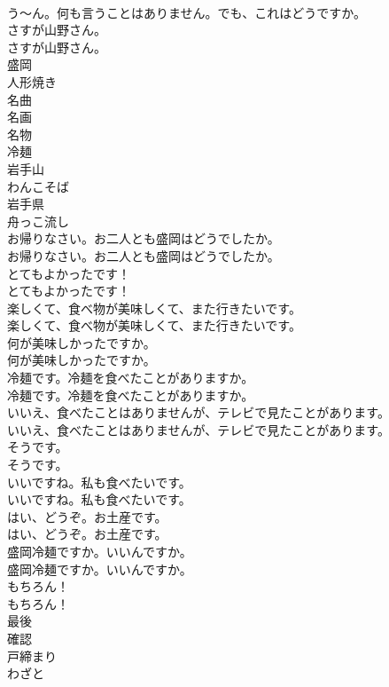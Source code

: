 \documentclass[8pt]{extreport}
\begin{document}
\begin{CJK}{UTF8}{min}
\\	う〜ん。何も言うことはありません。でも、これはどうですか。 
\\	さすが山野さん。	
\\	さすが山野さん。 
\\	盛岡
\\	人形焼き
\\	名曲
\\	名画
\\	名物
\\	冷麺
\\	岩手山
\\	わんこそば
\\	岩手県
\\	舟っこ流し
\\	お帰りなさい。お二人とも盛岡はどうでしたか。	
\\	お帰りなさい。お二人とも盛岡はどうでしたか。 
\\	とてもよかったです！	
\\	とてもよかったです！ 
\\	楽しくて、食べ物が美味しくて、また行きたいです。	
\\	楽しくて、食べ物が美味しくて、また行きたいです。 
\\	何が美味しかったですか。	
\\	何が美味しかったですか。 
\\	冷麺です。冷麺を食べたことがありますか。	
\\	冷麺です。冷麺を食べたことがありますか。 
\\	いいえ、食べたことはありませんが、テレビで見たことがあります。	
\\	いいえ、食べたことはありませんが、テレビで見たことがあります。 
\\	そうです。	
\\	そうです。 
\\	いいですね。私も食べたいです。	
\\	いいですね。私も食べたいです。 
\\	はい、どうぞ。お土産です。	
\\	はい、どうぞ。お土産です。 
\\	盛岡冷麺ですか。いいんですか。	
\\	盛岡冷麺ですか。いいんですか。 
\\	もちろん！	
\\	もちろん！ 
\\	最後
\\	確認
\\	戸締まり
\\	わざと

\end{CJK}
\end{document}
